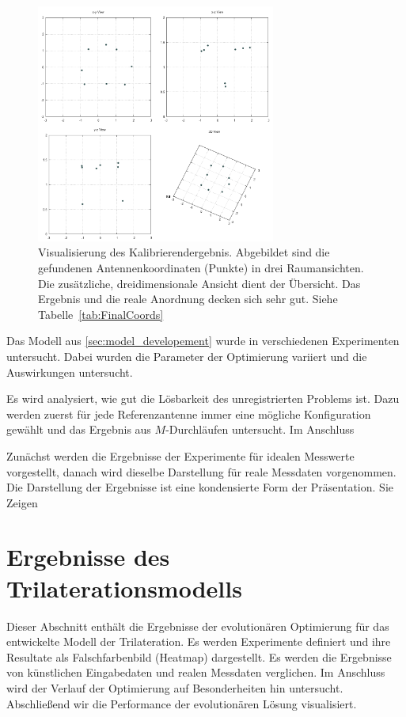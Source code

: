 \begin{figure}[ht!]
         \centering
         \includegraphics[width=0.7\textwidth]{img/calibration/calibration_results.png}
         \caption[Visualisierung des Kalibrierendergebnis]{Visualisierung des Kalibrierendergebnis. Abgebildet sind die gefundenen Antennenkoordinaten (Punkte) in drei Raumansichten. Die zusätzliche, dreidimensionale  Ansicht dient der Übersicht. Das Ergebnis und die reale Anordnung decken sich sehr gut. Siehe Tabelle~\ref{tab:FinalCoords}}
         \label{fig:3dplot_coordinates}
%
\end{figure}

Das Modell aus \ref{sec:model_developement} wurde in verschiedenen Experimenten untersucht. Dabei wurden die Parameter der Optimierung variiert und die Auswirkungen untersucht.

Es wird analysiert, wie gut die Lösbarkeit des unregistrierten Problems ist. Dazu werden zuerst für jede Referenzantenne immer eine mögliche Konfiguration gewählt und das Ergebnis aus $M$-Durchläufen untersucht. Im Anschluss %

Zunächst werden die Ergebnisse der Experimente für idealen Messwerte vorgestellt, danach wird dieselbe Darstellung für reale Messdaten vorgenommen. Die Darstellung der Ergebnisse ist eine kondensierte Form der Präsentation. Sie Zeigen 
%
%
\section{Ergebnisse des Trilaterationsmodells}
%
\label{sec:Results1}
%
Dieser Abschnitt enthält die Ergebnisse der evolutionären Optimierung für das entwickelte Modell der Trilateration. Es werden Experimente definiert und ihre Resultate als Falschfarbenbild (Heatmap) dargestellt. Es werden die Ergebnisse von künstlichen Eingabedaten und realen Messdaten verglichen. Im Anschluss wird der Verlauf der Optimierung auf Besonderheiten hin untersucht. Abschließend wir die Performance der evolutionären Lösung visualisiert.
%
